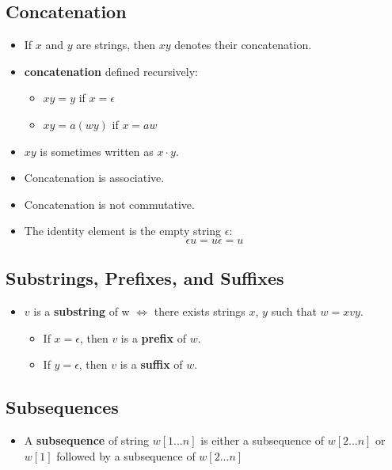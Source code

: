 \subsection{Concatenation}
\begin{itemize}
    \item If $x$ and $y$ are strings, then $xy$ denotes their concatenation.
    \item \textbf{concatenation} defined recursively:
        \begin{itemize}
            \item $xy = y$ if $x = \epsilon$
            \item $xy = a(wy)$ if $x = aw$
        \end{itemize}
    \item $xy$ is sometimes written as $x \cdot y$.
    \item Concatenation is associative.
    \item Concatenation is not commutative.
    \item The identity element is the empty string $\epsilon$:
    \begin{equation}
        \epsilon u = u \epsilon = u
    \end{equation}
\end{itemize}

\subsection{Substrings, Prefixes, and Suffixes}
\begin{itemize}
    \item $v$ is a \textbf{substring} of w $\iff$ there exists strings $x$, $y$ such that $w = xvy$.
        \begin{itemize}
            \item If $x = \epsilon$, then $v$ is a \textbf{prefix} of $w$.
            \item If $y = \epsilon$, then $v$ is a \textbf{suffix} of $w$.
        \end{itemize}
\end{itemize}

\subsection{Subsequences}
\begin{itemize}
    \item A \textbf{subsequence} of string $w[1...n]$ is either a subsequence of $w[2...n]$ or $w[1]$ followed by a subsequence of $w[2...n]$
\end{itemize}

